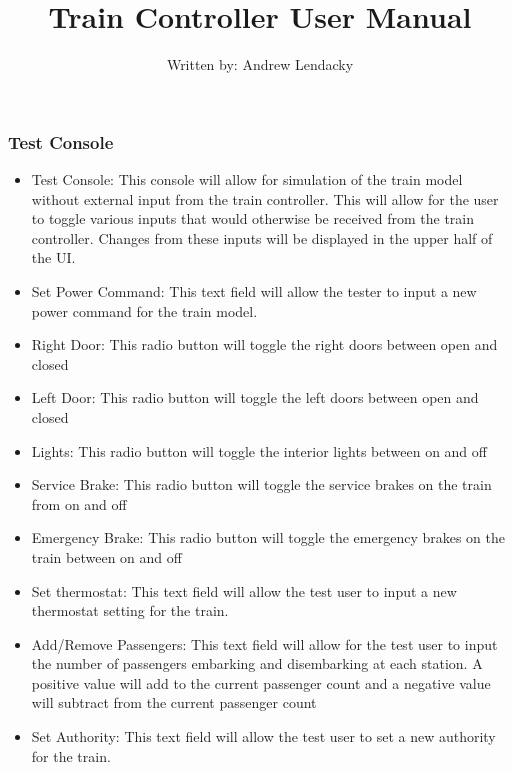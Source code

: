 \documentclass[letterpaper]{article}
\begin{document}
	\subsubsection{Test Console}
	\begin{itemize}
		\item Test Console: This console will allow for simulation of the train model without external input from the train controller. This will allow for the user to toggle various inputs that would otherwise be received from the train controller. Changes from these inputs will be displayed in the upper half of the UI.
		\item Set Power Command: This text field will allow the tester to input a new power command for the train model.
		\item Right Door: This radio button will toggle the right doors between open and closed
		\item Left Door: This radio button will toggle the left doors between open and closed
		\item Lights: This radio button will toggle the interior lights between on and off
		\item Service Brake: This radio button will toggle the service brakes on the train from on and off
		\item Emergency Brake: This radio button will toggle the emergency brakes on the train between on and off
		\item Set thermostat: This text field will allow the test user to input a new thermostat setting for the train.
		\item Add/Remove Passengers: This text field will allow for the test user to input the number of passengers embarking and disembarking at each station. A positive value will add to the current passenger count and a negative value will subtract from the current passenger count
		\item	Set Authority: This text field will allow the test user to set a new authority for the train.
	\end{itemize}

\newpage

\begin{center}
	\Large
	\title{Train Controller User Manual \\}
	\author{Written by: Andrew Lendacky}
	\date{}	
\end{center}

\maketitle
\end{document}
